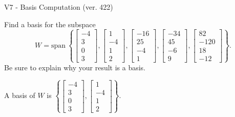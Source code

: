 \begin{exercise}
  \begin{exerciseTitle}V7 - Basis Computation (ver. 422)\end{exerciseTitle}
  \begin{exerciseStatement}
    Find a basis for the subspace 
\[W=\mathrm{span}\ \left\{\left[\begin{array}{r}
-4 \\
3 \\
0 \\
3
\end{array}\right] , \left[\begin{array}{r}
1 \\
-4 \\
1 \\
2
\end{array}\right] , \left[\begin{array}{r}
-16 \\
25 \\
-4 \\
1
\end{array}\right] , \left[\begin{array}{r}
-34 \\
45 \\
-6 \\
9
\end{array}\right] , \left[\begin{array}{r}
82 \\
-120 \\
18 \\
-12
\end{array}\right]\right\}.\]
 Be sure to explain why your result is a basis.


  \end{exerciseStatement}
  \begin{exerciseAnswer}
   A basis of \(W\) is  \(\left\{\left[\begin{array}{r}
-4 \\
3 \\
0 \\
3
\end{array}\right] , \left[\begin{array}{r}
1 \\
-4 \\
1 \\
2
\end{array}\right]\right\}\).
  


  \end{exerciseAnswer}
\end{exercise}